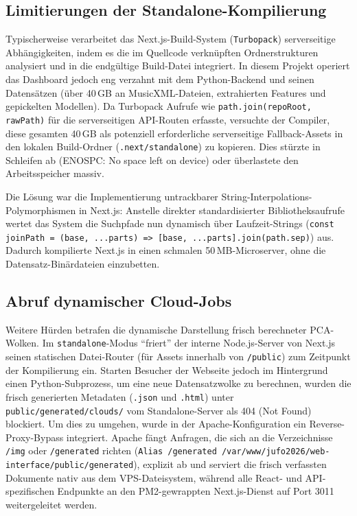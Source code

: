 \documentclass[10pt,a4paper]{article}
\theoremstyle{definition}
\begin{document}
\subsection{Limitierungen der Standalone-Kompilierung}
Typischerweise verarbeitet das Next.js-Build-System (\texttt{Turbopack}) serverseitige Abhängigkeiten, indem es die im Quellcode verknüpften Ordnerstrukturen analysiert und in die endgültige Build-Datei integriert. In diesem Projekt operiert das Dashboard jedoch eng verzahnt mit dem Python-Backend und seinen Datensätzen (über 40\,GB an MusicXML-Dateien, extrahierten Features und gepickelten Modellen). Da Turbopack Aufrufe wie \texttt{path.join(repoRoot, rawPath)} für die serverseitigen API-Routen erfasste, versuchte der Compiler, diese gesamten 40\,GB als potenziell erforderliche serverseitige Fallback-Assets in den lokalen Build-Ordner (\texttt{.next/standalone}) zu kopieren. Dies stürzte in Schleifen ab (ENOSPC: No space left on device) oder überlastete den Arbeitsspeicher massiv.

Die Lösung war die Implementierung untrackbarer String-Interpolations-Polymorphismen in Next.js: Anstelle direkter standardisierter Bibliotheksaufrufe wertet das System die Suchpfade nun dynamisch über Laufzeit-Strings (\texttt{const joinPath = (base, ...parts) => [base, ...parts].join(path.sep)}) aus. Dadurch kompilierte Next.js in einen schmalen 50\,MB-Microserver, ohne die Datensatz-Binärdateien einzubetten. 

\subsection{Abruf dynamischer Cloud-Jobs}
Weitere Hürden betrafen die dynamische Darstellung frisch berechneter PCA-Wolken. Im \texttt{standalone}-Modus \enquote{friert} der interne Node.js-Server von Next.js seinen statischen Datei-Router (für Assets innerhalb von \texttt{/public}) zum Zeitpunkt der Kompilierung ein. Starten Besucher der Webseite jedoch im Hintergrund einen Python-Subprozess, um eine neue Datensatzwolke zu berechnen, wurden die frisch generierten Metadaten (\texttt{.json} und \texttt{.html}) unter \texttt{public/generated/clouds/} vom Standalone-Server als 404 (Not Found) blockiert. Um dies zu umgehen, wurde in der Apache-Konfiguration ein Reverse-Proxy-Bypass integriert. Apache fängt Anfragen, die sich an die Verzeichnisse \texttt{/img} oder \texttt{/generated} richten (\texttt{Alias /generated /var/www/jufo2026/web-interface/public/generated}), explizit ab und serviert die frisch verfassten Dokumente nativ aus dem VPS-Dateisystem, während alle React- und API-spezifischen Endpunkte an den PM2-gewrappten Next.js-Dienst auf Port 3011 weitergeleitet werden. 
\end{document}
